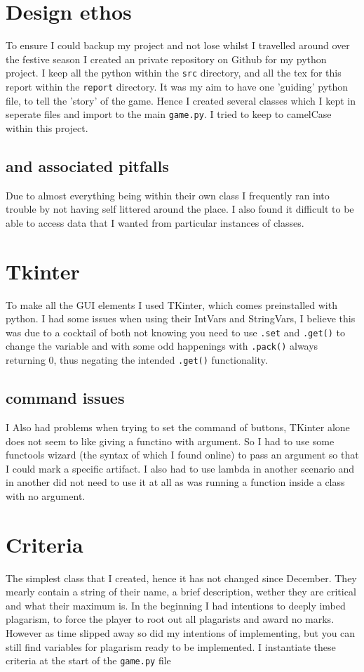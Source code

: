 \documentclass[twocolumn]{article}   %
\begin{document}
\section{Design ethos}
To ensure I could backup my project and not lose whilst I travelled around over the festive season I created an private repository on Github for my python project. I keep all the python within the \texttt{src} directory, and all the tex for this report within the \texttt{report} directory.
It was my aim to have one 'guiding' python file, to tell the 'story' of the game. Hence I created several classes which I kept in seperate files and import to the main \texttt{game.py}. I tried to keep to camelCase within this project.
  \subsection{and associated pitfalls}
  Due to almost everything being within their own class I frequently ran into trouble by not having self littered around the place. I also found it difficult to be able to access data that I wanted from particular instances of classes.

\section{Tkinter}
To make all the GUI elements I used TKinter\cite{TKinter}, which comes preinstalled with python. I had some issues when using their IntVars and StringVars, I believe this was due to a cocktail of both not knowing you need to use \texttt{.set} and \texttt{.get()} to change the variable and with some odd happenings with \texttt{.pack()} always returning 0, thus negating the intended \texttt{.get()} functionality.
  \subsection{command issues}
  I Also had problems when trying to set the command of buttons, TKinter alone does not seem to like giving a functino with argument. So I had to use some functools wizard (the syntax of which I found online) to pass an argument so that I could mark a specific artifact. I also had to use lambda in another scenario and in another did not need to use it at all as was running a function inside a class with no argument.

\section{Criteria}
The simplest class that I created, hence it has not changed since December. They mearly contain a string of their name, a brief description, wether they are critical and what their maximum is. In the beginning I had intentions to deeply imbed plagarism, to force the player to root out all plagarists and award no marks. However as time slipped away so did my intentions of implementing, but you can still find variables for plagarism ready to be implemented. I instantiate these criteria at the start of the \texttt{game.py} file
\end{document}
